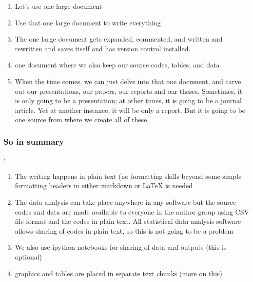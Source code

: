 \begin{enumerate}
\item Let's use one large document
\item Use that one large document to write everything
\item The one large document gets expanded, commented, and written and rewritten and saves itself and has version control installed.
\item one document where we also keep our source codes, tables, and data
\item When the time comes, we can just delve into that one document, and carve out our presentations, our papers, our reports and our theses. Sometimes, it is only going to be a presentation; at other times, it is going to be a journal article. Yet at another instance, it will be only a report. But it is going to be one source from where we create all of these. 
\end{enumerate}

\subsubsection{So in summary}:

\begin{enumerate}
\item The writing happens in plain text (no formatting skills beyond some simple formatting headers in either markdown or LaTeX is needed
\item The data analysis can take place anywhere in any software but the source codes and data are made available to everyone in the author group using CSV file format and the codes in plain text. All statistical data analysis software allows sharing of codes in plain text, so this is not going to be a problem
\item We also use ipython notebooks for sharing of data and outputs (this is optional)
\item graphics and tables are placed in separate text chunks (more on this)
\end{enumerate}


    